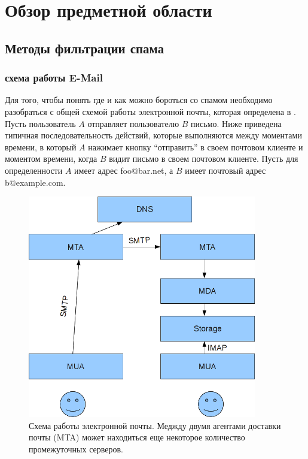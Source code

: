 \newpage
\section{Обзор предметной области}
\label{review}

\subsection{Методы фильтрации спама}
\subsubsection{схема работы E-Mail}
Для того, чтобы понять где и как можно бороться со спамом необходимо разобраться с общей схемой работы электронной почты, которая определена в \cite{RFC2081}. Пусть пользователь $A$ отправляет пользователю $B$ письмо. Ниже приведена типичная последовательность действий, которые выполняются между моментами времени, в который $A$ нажимает кнопку ``отправить'' в своем почтовом клиенте и моментом времени, когда $B$ видит письмо в своем почтовом клиенте. Пусть для определенности $A$ имеет адрес foo@bar.net, а $B$ имеет почтовый адрес b@example.com.

\begin{figure}[h]
\begin{center}
\includegraphics[width=10cm]{img/emailscheme}
\end{center}
\caption{Схема работы электронной почты. Меджду двумя агентами доставки почты (MTA) может находиться еще некоторое количество промежуточных серверов.}
\label{email_scheme}
\end{figure}

